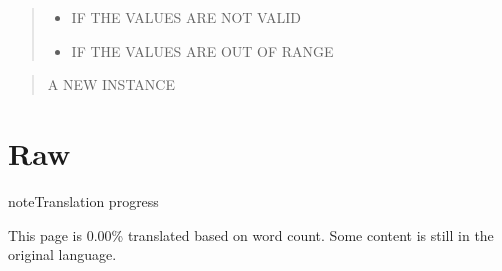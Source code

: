 \documentclass[letterpaper,10pt,english]{sphinxmanual}
\begin{document}
\begin{fulllineitems}

\pysigstartsignatures
\pysiglinewithargsret
{}
{}
{}
\pysigstopsignatures\begin{quote}\begin{description}
\begin{itemize}
\item {} 
\sphinxAtStartPar
{} \sphinxhyphen{}\sphinxhyphen{} IF THE VALUES ARE NOT VALID

\item {} 
\sphinxAtStartPar
{} \sphinxhyphen{}\sphinxhyphen{} IF THE VALUES ARE OUT OF RANGE

\end{itemize}

\end{description}\end{quote}

\end{fulllineitems}



\begin{fulllineitems}

\pysigstartsignatures
\pysigline
{}
\pysigstopsignatures\begin{quote}\begin{description}
\sphinxAtStartPar
A NEW  INSTANCE

\end{description}\end{quote}

\end{fulllineitems}


\sphinxstepscope


\chapter{Raw}
\label{\detokenize{raw:raw}}\label{\detokenize{raw::doc}}
\begin{sphinxadmonition}{note}{Translation progress}

\sphinxAtStartPar
This page is 0.00\% translated based on word count. Some content is still in the original language.
\end{sphinxadmonition}
\end{document}
